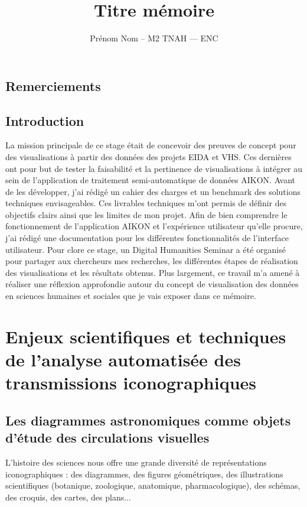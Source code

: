 \documentclass[a4paper,12pt,twoside]{book}
\author{Prénom Nom – M2 TNAH — ENC}
\title{Titre mémoire}
\newcommand\chapterNo[1]{
	\chapter*{#1}
	\markright{\MakeUppercase{#1}}
}
\begin{document}
	\onehalfspacing
	\frontmatter

	

	\thispagestyle{empty}
	\cleardoublepage

	

	\chapterNo{Remerciements}

	\chapterNo{Introduction}

	La mission principale de ce stage était de concevoir des preuves de concept pour des visualisations à partir des données des projets EIDA et VHS. Ces dernières ont pour but de tester la faisabilité et la pertinence de visualisations à intégrer au sein de l’application de traitement semi-automatique de données AIKON. Avant de les développer, j’ai rédigé un cahier des charges et un benchmark des solutions techniques envisageables. Ces livrables techniques m’ont permis de définir des objectifs clairs ainsi que les limites de mon projet. Afin de bien comprendre le fonctionnement de l’application AIKON et l’expérience utilisateur qu’elle procure, j’ai rédigé une documentation pour les différentes fonctionnalités de l’interface utilisateur. Pour clore ce stage, un Digital Humanities Seminar a été organisé pour partager aux chercheurs mes recherches, les différentes étapes de réalisation des visualisations et les résultats obtenus. Plus largement, ce travail m’a amené à réaliser une réflexion approfondie autour du concept de visualisation des données en sciences humaines et sociales que je vais exposer dans ce mémoire.

	\thispagestyle{empty}
	\cleardoublepage

	\mainmatter

	\part{Enjeux scientifiques et techniques de l'analyse automatisée des transmissions iconographiques}

	
	\chapter[Les diagrammes astronomiques]{Les diagrammes astronomiques comme objets d'étude des circulations visuelles}

	L'histoire des sciences nous offre une grande diversité de représentations iconographiques : des diagrammes, des figures géométriques, des illustrations scientifiques (botanique, zoologique, anatomique, pharmacologique), des schémas, des croquis, des cartes, des plans...
	
\end{document}

